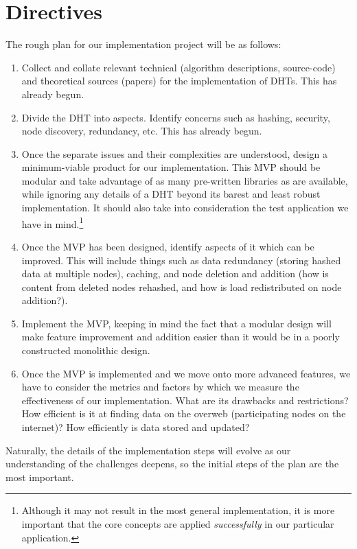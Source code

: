 \documentclass[12pt]{article}
\begin{document}
    \section{Directives}
    The rough plan for our implementation project will be as follows:
    \begin{enumerate}
        \item Collect and collate relevant technical (algorithm descriptions,
            source-code) and theoretical sources (papers) for the implementation
            of DHTs.  This has already begun.
        \item Divide the DHT into aspects.  Identify concerns such as hashing,
            security, node discovery, redundancy, etc.  This has already begun.
        \item Once the separate issues and their complexities are understood,
            design a minimum-viable product for our implementation.  This MVP
            should be modular and take advantage of as many pre-written
            libraries as are available, while ignoring any details of a DHT
            beyond its barest and least robust implementation.  It should also
            take into consideration the test application we have in
            mind.\footnote{Although it may not result in the most general implementation, it is
            more important that the core concepts are applied
            \textit{successfully} in our particular application.}
        \item Once the MVP has been designed, identify aspects of it which can
            be improved.  This will include things such as data redundancy
            (storing hashed data at multiple nodes), caching, and node
            deletion and addition (how is content from deleted nodes rehashed,
            and how is load redistributed on node addition?).
        \item Implement the MVP, keeping in mind the fact that a
            modular design will make feature improvement and addition easier
            than it would be in a poorly constructed monolithic design.
        \item Once the MVP is implemented and we move onto more advanced
            features, we have to consider the metrics and factors by which we
            measure the effectiveness of our implementation.  What are its
            drawbacks and restrictions?  How efficient is it at finding data on
            the overweb (participating nodes on the internet)?  How efficiently is
            data stored and updated?
    \end{enumerate}
    Naturally, the details of the implementation steps will evolve as our
    understanding of the challenges deepens, so the initial steps of the plan
    are the most important.
\end{document}
